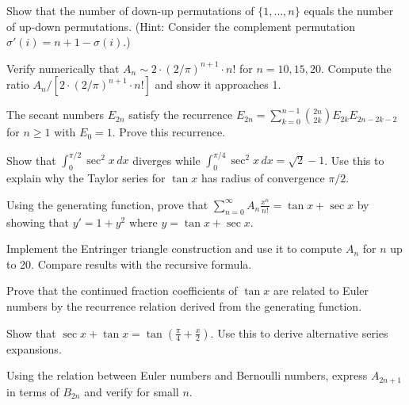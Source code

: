 \begin{exercise}
Show that the number of down-up permutations of $\{1, \ldots, n\}$ equals the number of up-down permutations.
(Hint: Consider the complement permutation $\sigma'(i) = n+1 - \sigma(i)$.)
\end{exercise}

\begin{exercise}
Verify numerically that $A_n \sim 2 \cdot (2/\pi)^{n+1} \cdot n!$ for $n = 10, 15, 20$.
Compute the ratio $A_n / [2 \cdot (2/\pi)^{n+1} \cdot n!]$ and show it approaches 1.
\end{exercise}

\begin{exercise}
The secant numbers $E_{2n}$ satisfy the recurrence $E_{2n} = \sum_{k=0}^{n-1} \binom{2n}{2k} E_{2k} E_{2n-2k-2}$ for $n \geq 1$ with $E_0 = 1$. Prove this recurrence.
\end{exercise}

\begin{exercise}
Show that $\int_0^{\pi/2} \sec^2 x \, dx$ diverges while $\int_0^{\pi/4} \sec^2 x \, dx = \sqrt{2} - 1$. Use this to explain why the Taylor series for $\tan x$ has radius of convergence $\pi/2$.
\end{exercise}

\begin{exercise}
Using the generating function, prove that $\sum_{n=0}^{\infty} A_n \frac{x^n}{n!} = \tan x + \sec x$ by showing that $y' = 1 + y^2$ where $y = \tan x + \sec x$.
\end{exercise}

\begin{exercise}[Computational]
Implement the Entringer triangle construction and use it to compute $A_n$ for $n$ up to 20. Compare results with the recursive formula.
\end{exercise}

\begin{exercise}
Prove that the continued fraction coefficients of $\tan x$ are related to Euler numbers by the recurrence relation derived from the generating function.
\end{exercise}

\begin{exercise}
Show that $\sec x + \tan x = \tan\left(\frac{\pi}{4} + \frac{x}{2}\right)$. Use this to derive alternative series expansions.
\end{exercise}

\begin{exercise}
Using the relation between Euler numbers and Bernoulli numbers, express $A_{2n+1}$ in terms of $B_{2n}$ and verify for small $n$.
\end{exercise}
